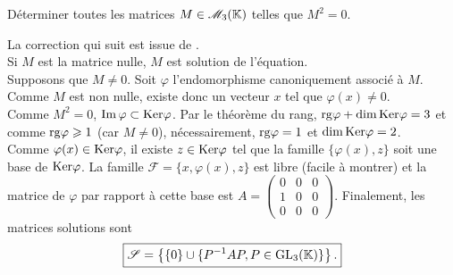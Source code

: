 \begin{exercice}
    Déterminer toutes les matrices $M \in \mathscr{M}_3(\mathbb{K})$ telles que $M^2=0$.
\end{exercice}

\begin{solution}
    La correction qui suit est issue de \cite{ellipses}. \\
    Si $M$ est la matrice nulle, $M$ est solution de l'équation. \\
    Supposons que $M \not= 0$. Soit $\varphi$ l'endomorphisme canoniquement associé à $M$. \\
    Comme $M$ est non nulle, existe donc un vecteur $x$ tel que $\varphi(x) \not= 0$. \\
    Comme $M^2 = 0$, $\Im \varphi \subset \mathrm{Ker} \varphi$. Par le théorème du rang, $\mathrm{rg} \varphi + \dim \mathrm{Ker} \varphi = 3$ et comme $\mathrm{rg} \varphi \geqslant 1$ (car $M \not=0$), nécessairement, $\mathrm{rg} \varphi = 1$ et $\dim \mathrm{Ker} \varphi = 2$. \\
    Comme $\varphi(x) \in \mathrm{Ker} \varphi$, il existe $z \in \mathrm{Ker} \varphi$ tel que la famille $\{ \varphi(x), z \}$ soit une base de $\mathrm{Ker} \varphi$. La famille $\mathscr{F} = \{x, \varphi(x), z \}$ est libre (facile à montrer) et la matrice de $\varphi$ par rapport à cette base est 
    $A = 
    \begin{pmatrix}
    0 & 0 & 0 \\
    1 & 0 & 0 \\ 
    0 & 0 & 0
    \end{pmatrix}
    $. 
    Finalement, les matrices solutions sont
    $$\boxed{\mathscr{S} = \left \{ \{0\} \cup \{P^{-1} A P, P \in \mathrm{GL}_3(\mathbb{K}) \} \right \}.}$$
\end{solution}
